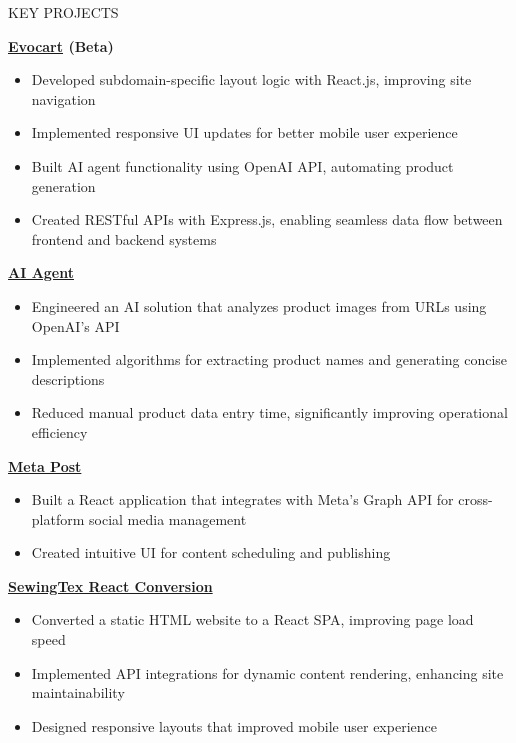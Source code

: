 \documentclass{resume} %
\begin{document}
\begin{rSection}{KEY PROJECTS}
\vspace{-1.25em}
\item \textbf{\href{https://apple.nazarahnaturals.com/}{Evocart} (Beta)} 
\begin{itemize}
    \itemsep -3pt {}
    \item Developed subdomain-specific layout logic with React.js, improving site navigation
    \item Implemented responsive UI updates for better mobile user experience
    \item Built AI agent functionality using OpenAI API, automating product generation
    \item Created RESTful APIs with Express.js, enabling seamless data flow between frontend and backend systems
\end{itemize}

\item \textbf{\href{https://github.com/rafidrahman1/ai_agent}{AI Agent}}
\begin{itemize}
    \itemsep -3pt {}
    \item Engineered an AI solution that analyzes product images from URLs using OpenAI's API
    \item Implemented algorithms for extracting product names and generating concise descriptions
    \item Reduced manual product data entry time, significantly improving operational efficiency
\end{itemize}

\item \textbf{\href{https://github.com/rafidrahman1/meta_post}{Meta Post}}
\begin{itemize}
    \itemsep -3pt {}
    \item Built a React application that integrates with Meta's Graph API for cross-platform social media management
    \item Created intuitive UI for content scheduling and publishing
\end{itemize}

\item \textbf{\href{https://sewingtexapparels.com/}{SewingTex React Conversion}}
\begin{itemize}
    \itemsep -3pt {}
    \item Converted a static HTML website to a React SPA, improving page load speed
    \item Implemented API integrations for dynamic content rendering, enhancing site maintainability
    \item Designed responsive layouts that improved mobile user experience
\end{itemize}


\end{rSection}
\end{document}
